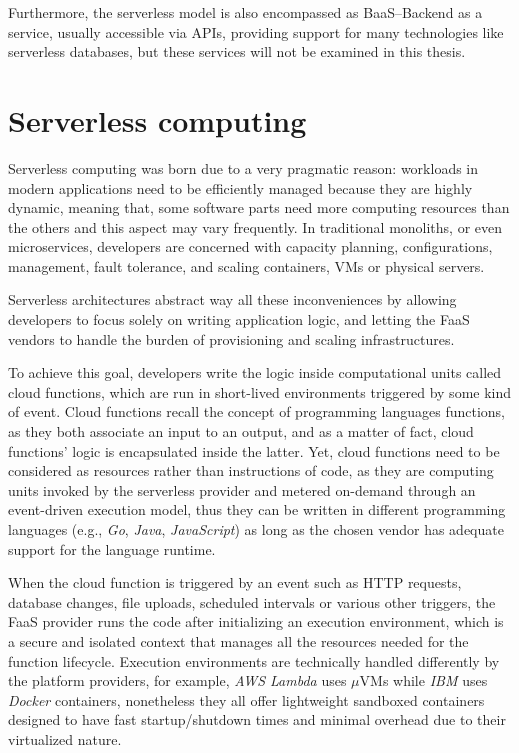 Furthermore, the serverless model is also encompassed as BaaS--Backend as a service,
usually accessible via APIs, providing support for many technologies like serverless databases,
but these services will not be examined in this thesis.

\section{Serverless computing}

Serverless computing was born due to a very pragmatic reason:
workloads in modern applications need to be efficiently managed
because they are highly dynamic, meaning that, some software parts
need more computing resources than the others and this aspect may vary frequently.
In traditional monoliths, or even microservices, developers are concerned
with capacity planning, configurations, management, fault tolerance, and
scaling containers, VMs or physical servers.

Serverless architectures abstract way all these inconveniences
by allowing developers to focus solely on writing application logic,
and letting the FaaS vendors to handle the burden of provisioning and scaling infrastructures.

To achieve this goal, developers write the logic inside computational units
called cloud functions, which are run in short-lived environments triggered by some kind of event.
Cloud functions recall the concept of programming languages functions,
as they both associate an input to an output, and as a matter of fact, 
cloud functions' logic is encapsulated inside the latter.
Yet, cloud functions need to be considered as resources rather than instructions of code,
as they are computing units invoked by the serverless provider and metered on-demand through an event-driven execution model,
thus they can be written in different programming languages (e.g., \textit{Go}, \textit{Java}, \textit{JavaScript})
as long as the chosen vendor has adequate support for the language runtime.

When the cloud function is triggered by an event such as
HTTP requests, database changes, file uploads, scheduled intervals or various other triggers,
the FaaS provider runs the code
after initializing an execution environment, which is a secure and isolated context
that manages all the resources needed for the function lifecycle.
Execution environments are technically handled differently by the platform providers, for example,
\textit{AWS Lambda} uses $\mu$VMs while \textit{IBM} uses \textit{Docker} containers,
nonetheless they all offer lightweight sandboxed containers designed to
have fast startup/shutdown times and minimal overhead due to their virtualized nature.


